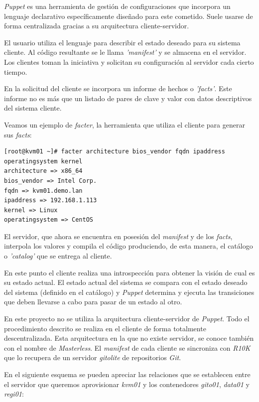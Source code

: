 \documentclass[a4paper,12pt,spanish,final]{epsc_tfc_pfc}
\begin{document}
\emph{Puppet} es una herramienta de gestión de configuraciones que incorpora un lenguaje declarativo específicamente diseñado para este cometido. Suele usarse de forma centralizada gracias a su arquitectura cliente-servidor.

El usuario utiliza el lenguaje para describir el estado deseado para su sistema cliente. Al código resultante se le llama \emph{'manifest'} y se almacena en el servidor. Los clientes toman la iniciativa y solicitan su configuración al servidor cada cierto tiempo.

En la solicitud del cliente se incorpora un informe de hechos o \emph{'facts'}. Este informe no es más que un listado de pares de clave y valor con datos descriptivos del sistema cliente.

Veamos un ejemplo de \emph{facter}, la herramienta que utiliza el cliente para generar sus \emph{facts}:\\

\begin{lstlisting}[style=dnsmasq]
[root@kvm01 ~]# facter architecture bios_vendor fqdn ipaddress operatingsystem kernel
architecture => x86_64
bios_vendor => Intel Corp.
fqdn => kvm01.demo.lan
ipaddress => 192.168.1.113
kernel => Linux
operatingsystem => CentOS
\end{lstlisting}

El servidor, que ahora se encuentra en posesión del \emph{manifest} y de los \emph{facts}, interpola los valores y compila el código produciendo, de esta manera, el catálogo o \emph{'catalog'} que se entrega al cliente.

En este punto el cliente realiza una introspección para obtener la visión de cual es su estado actual. El estado actual del sistema se compara con el estado deseado del sistema (definido en el catálogo) y \emph{Puppet} determina y ejecuta las transiciones que deben llevarse a cabo para pasar de un estado al otro.

En este proyecto no se utiliza la arquitectura cliente-servidor de \emph{Puppet}. Todo el procedimiento descrito se realiza en el cliente de forma totalmente descentralizada. Esta arquitectura en la que no existe servidor, se conoce también con el nombre de \emph{Masterless}. El \emph{manifest} de cada cliente se sincroniza con \emph{R10K} que lo recupera de un servidor \emph{gitolite} de repositorios \emph{Git}.

En el siguiente esquema se pueden apreciar las relaciones que se establecen entre el servidor que queremos aprovisionar \emph{kvm01} y los contenedores \emph{gito01}, \emph{data01} y \emph{regi01}:\\
\end{document}
